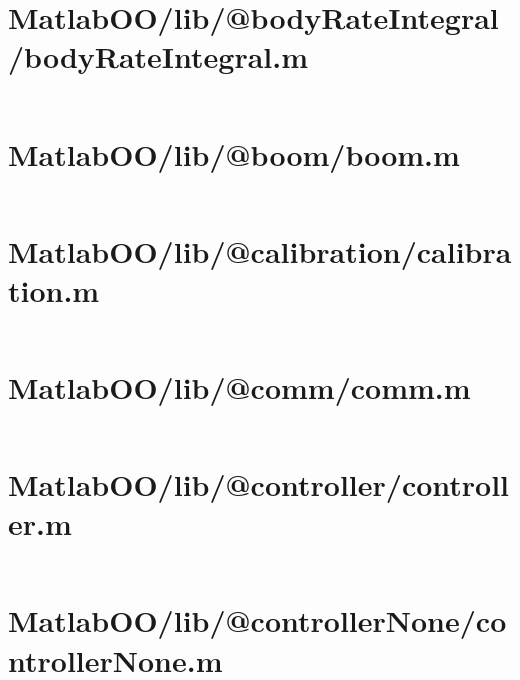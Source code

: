 \pagebreak
\section{MatlabOO/lib/@bodyRateIntegral/bodyRateIntegral.m}\label{code:MatlabOO/lib/@bodyRateIntegral/bodyRateIntegral.m}
\inputminted[linenos,fontsize=\scriptsize]{matlab}{/home/dcouture/git/mathyourlife/TSatPy/beta_versions/matlab_object_oriented/lib/@bodyRateIntegral/bodyRateIntegral.m}

\pagebreak
\section{MatlabOO/lib/@boom/boom.m}\label{code:MatlabOO/lib/@boom/boom.m}
\inputminted[linenos,fontsize=\scriptsize]{matlab}{/home/dcouture/git/mathyourlife/TSatPy/beta_versions/matlab_object_oriented/lib/@boom/boom.m}

\pagebreak
\section{MatlabOO/lib/@calibration/calibration.m}\label{code:MatlabOO/lib/@calibration/calibration.m}
\inputminted[linenos,fontsize=\scriptsize]{matlab}{/home/dcouture/git/mathyourlife/TSatPy/beta_versions/matlab_object_oriented/lib/@calibration/calibration.m}

\pagebreak
\section{MatlabOO/lib/@comm/comm.m}\label{code:MatlabOO/lib/@comm/comm.m}
\inputminted[linenos,fontsize=\scriptsize]{matlab}{/home/dcouture/git/mathyourlife/TSatPy/beta_versions/matlab_object_oriented/lib/@comm/comm.m}

\pagebreak
\section{MatlabOO/lib/@controller/controller.m}\label{code:MatlabOO/lib/@controller/controller.m}
\inputminted[linenos,fontsize=\scriptsize]{matlab}{/home/dcouture/git/mathyourlife/TSatPy/beta_versions/matlab_object_oriented/lib/@controller/controller.m}

\pagebreak
\section{MatlabOO/lib/@controllerNone/controllerNone.m}\label{code:MatlabOO/lib/@controllerNone/controllerNone.m}
\inputminted[linenos,fontsize=\scriptsize]{matlab}{/home/dcouture/git/mathyourlife/TSatPy/beta_versions/matlab_object_oriented/lib/@controllerNone/controllerNone.m}

